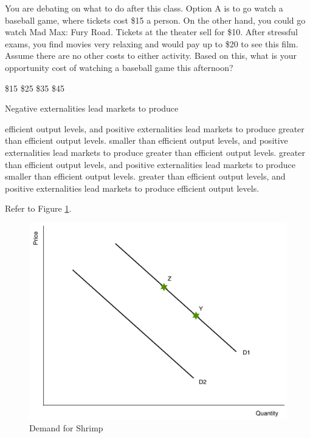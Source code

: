 \documentclass[addpoints,11pt]{exam}
\theoremstyle{definition}
\begin{document}
\begin{questions}
	
	\question You are debating on what to do after this class. Option A is to go watch a baseball game, where tickets cost \$15 a person. On the other hand, you could go watch Mad Max: Fury Road. Tickets at the theater sell for \$10. After stressful exams, you find movies very relaxing and would pay up to \$20 to see this film. Assume there are no other costs to either activity. Based on this, what is your opportunity cost of watching a baseball game this afternoon?
	
		\begin{choices}
				\choice \$15
				\CorrectChoice \$25
				\choice \$35
				\choice \$45
		\end{choices}
		
		
\question Negative externalities lead markets to produce
	
	\begin{choices}
		\choice efficient output levels, and positive externalities lead markets to produce greater than efficient output levels.
		\choice smaller than efficient output levels, and positive externalities lead markets to produce greater than efficient output levels.
		\CorrectChoice greater than efficient output levels, and positive externalities lead markets to produce smaller than efficient output levels.
		\choice greater than efficient output levels, and positive externalities lead markets to produce efficient output levels.
	\end{choices}
	

\question Refer to Figure \ref{MC2}.


\begin{figure}[H]
	\centering
	\includegraphics[scale=.40]{Exam1_MC2.pdf}
	\caption{Demand for Shrimp}
	\label{MC2}
\end{figure}


\end{questions}
\end{document}
